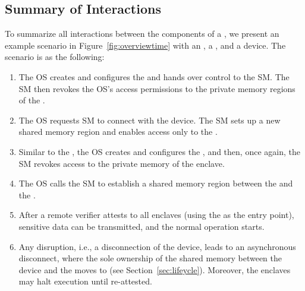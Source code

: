 \subsection{Summary of Interactions}
To summarize all interactions between the components of a \nameenclave, we present an example scenario in Figure~\ref{fig:overviewtime} with an \app{}, a \ce{}, and a \sphw device. The scenario is as the following:
\begin{enumerate}
    \item[\one] The OS creates and configures the \ce{} and hands over control to the SM. The SM then revokes the OS's access permissions to the private memory regions of the \ce{}.
    \item[\two] The OS requests SM to connect \ce{} with the \sphw device. The SM sets up a new shared memory region and enables access only to the \ce{}.
    \item[\three] Similar to the \ce, the OS creates and configures the \app{}, and then, once again, the SM revokes access to the private memory of the enclave.
    \item[\four] The OS calls the SM to establish a shared memory region between the \ce and the \app. 
    \item[\five] After a remote verifier attests to all enclaves (using the \app as the entry point), sensitive data can be transmitted, and the normal operation starts.
    \item[\six] Any disruption, i.e., a disconnection of the \sphw device, leads to an asynchronous disconnect, where the sole ownership of the shared memory between the device and the \ce{} moves to \ce(see Section~\ref{sec:lifeycle}). Moreover, the enclaves may halt execution until re-attested.
\end{enumerate}



